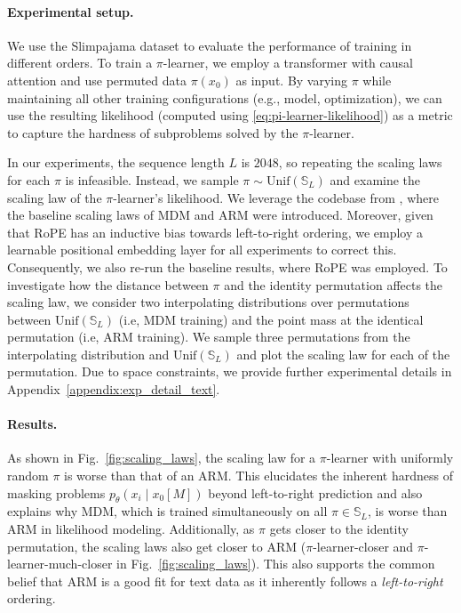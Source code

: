 \documentclass{article}
\theoremstyle{plain}
\theoremstyle{definition}
\theoremstyle{remark}
\begin{document}
\paragraph{Experimental setup.} We use the Slimpajama dataset \cite{soboleva2023slimpajama} to evaluate the performance of training in different orders. To train a $\pi$-learner, we employ a transformer with causal attention and use permuted data $\pi(x_0)$ as input. By varying $\pi$ while maintaining all other training configurations (e.g., model, optimization), we can use the resulting likelihood (computed using \cref{eq:pi-learner-likelihood}) as a metric to capture the hardness of subproblems solved by the $\pi$-learner.

In our experiments, the sequence length $L$ is $2048$, so repeating the scaling laws for each $\pi$ is infeasible. Instead, we sample $\pi \sim \mathrm{Unif}(\mathbb{S}_L)$ and examine the scaling law of the $\pi$-learner's likelihood. We leverage the codebase from \cite{nie2024scaling}, where the baseline scaling laws of MDM and ARM were introduced. Moreover, given that RoPE has an inductive bias towards left-to-right ordering, we employ a learnable positional embedding layer for all experiments to correct this. Consequently, we also re-run the baseline results, where RoPE was employed. To investigate how the distance between $\pi$ and the identity permutation affects the scaling law, we consider two interpolating distributions over permutations between $\mathrm{Unif}(\mathbb{S}_L)$ (i.e, MDM training) and the point mass at the identical permutation (i.e, ARM training). We sample three permutations from the interpolating distribution and $\mathrm{Unif}(\mathbb{S}_L)$ and plot the scaling law for each of the permutation. Due to space constraints, we provide further experimental details in Appendix~\ref{appendix:exp_detail_text}.


\paragraph{Results.} As shown in Fig.~\ref{fig:scaling_laws}, the scaling law for a $\pi$-learner with uniformly random $\pi$ is worse than that of an ARM. This elucidates the inherent hardness of masking problems \( p_\theta(x_i \mid x_0[M]) \) beyond left-to-right prediction and also explains why MDM, which is trained simultaneously on all $\pi \in \mathbb{S}_L$, is worse than ARM in likelihood modeling. Additionally, as $\pi$ gets closer to the identity permutation, the scaling laws also get closer to ARM ($\pi$-learner-closer and $\pi$-learner-much-closer in Fig.~\ref{fig:scaling_laws}). This also supports the common belief that ARM is a good fit for text data as it inherently follows a \emph{left-to-right} ordering.
\end{document}
